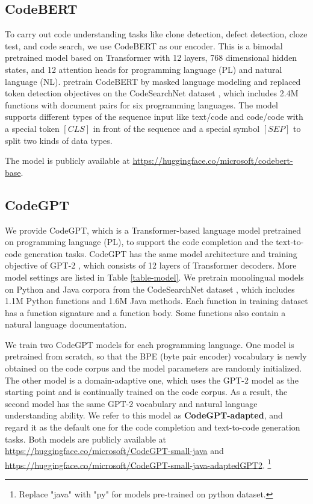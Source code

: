 \documentclass[sigconf,nonacm,screen]{acmart}
\begin{document}
\subsection{CodeBERT}
To carry out code understanding tasks like clone detection, defect detection, cloze test, and code search, we use CodeBERT \cite{feng2020codebert} as our encoder. 
This is a bimodal pretrained model based on Transformer with 12 layers, 768 dimensional hidden states, and 12 attention heads for programming language (PL) and natural language (NL). 
\citet{feng2020codebert} pretrain CodeBERT by masked language modeling and replaced token detection objectives on the CodeSearchNet dataset \cite{husain2019codesearchnet}, which includes 2.4M functions with document pairs for six programming languages. 
The model supports different types of the sequence input like text/code and code/code with a special token  $[CLS]$ in front of the sequence and a special symbol $[SEP]$ to split two kinds of data types. 

The model is publicly available at \url{https://huggingface.co/microsoft/codebert-base}.



\subsection{CodeGPT}\label{section:codeGPT}
We provide CodeGPT, 
which is a Transformer-based language model pretrained on programming language (PL), to support the code completion and the text-to-code generation tasks. CodeGPT has the same model architecture and training objective of GPT-2 \cite{radford2019language}, which consists of 12 layers of Transformer decoders. More model settings are listed in Table \ref{table-model}. We pretrain monolingual models on Python and Java corpora from the CodeSearchNet dataset \cite{husain2019codesearchnet}, which includes 1.1M Python functions and 1.6M Java methods. Each function in training dataset has a function signature and a function body. Some functions also contain a natural language documentation. 

We train two CodeGPT models for each programming language. One model is pretrained from scratch, so that the BPE (byte pair encoder) \cite{sennrich2016bpe} vocabulary is newly obtained on the code corpus and the model parameters are randomly initialized. The other model is a domain-adaptive one, which uses the GPT-2 model as the starting point and is continually trained on the code corpus. As a result, the second model has the same GPT-2 vocabulary and natural language understanding ability. 
We refer to this model as \textbf{CodeGPT-adapted}, and regard it as the default one for the code completion and text-to-code generation tasks. 
Both models are publicly available at \url{https://huggingface.co/microsoft/CodeGPT-small-java} and \url{https://huggingface.co/microsoft/CodeGPT-small-java-adaptedGPT2}. \footnote{Replace "java" with "py" for models pre-trained on python dataset.}
\end{document}
